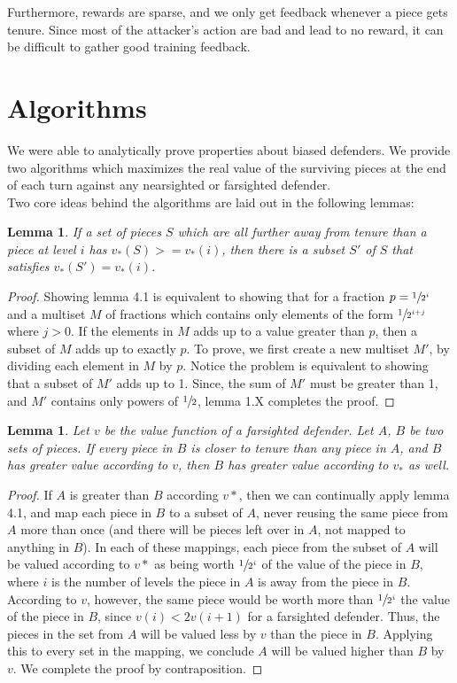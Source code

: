 \documentclass{article}
\theoremstyle{plain}
\newtheorem{lem}[thm]{Lemma}
\theoremstyle{definition}
\theoremstyle{remark}
\begin{document}
Furthermore, rewards are sparse, and we only get feedback whenever a piece gets tenure. Since most of the attacker's action are bad and lead to no reward, it can be difficult to gather good training feedback.
\section{Algorithms }
We were able to analytically prove properties about biased defenders. We provide two algorithms which maximizes the real value of the surviving pieces at the end of each turn against any nearsighted or farsighted defender.\\

Two core ideas behind the algorithms  are laid out in the following lemmas:

\begin{lem}
  If a set of pieces $S$ which are all further away from tenure than a piece at level $i$ has $v_{*}(S) >= v_{*}(i)$, then there is a subset $S'$ of $S$ that satisfies $v_{*}(S') = v_{*}(i)$.
\end{lem}


\begin{proof}
 Showing lemma 4.1 is equivalent to showing that for a fraction $p = \sfrac{1}{2^i}$ and a multiset $M$ of fractions which contains only elements of the form $\sfrac{1}{2^{i+j}}$ where $j>0$. If the elements in $M$ adds up to a value greater than $p$, then a subset of $M$ adds up to exactly $p$. To prove, we first create a new multiset $M'$, by dividing each element in $M$ by $p$. Notice the problem is equivalent to showing that a subset of $M'$ adds up to 1. Since, the sum of $M'$ must be greater than 1, and $M'$ contains only powers of $\sfrac{1}{2}$, lemma 1.X completes the proof.
\end{proof}

\begin{lem}
  Let $v$ be the value function of a farsighted defender. Let $A$, $B$ be two sets of pieces. If every piece in $B$ is closer to tenure than any piece in $A$, and  $B$ has greater value according to $v$, then $B$ has greater value according to $v_{*}$ as well.
\end{lem}

\begin{proof}
 If $A$ is greater than $B$ according $v*$, then we can continually apply lemma 4.1, and map each piece in $B$ to a subset of $A$, never reusing the same piece from $A$ more than once (and there will be pieces left over in $A$, not mapped to anything in $B$). In each of these mappings, each piece from the subset of $A$ will be valued according to $v*$ as being worth $\sfrac{1}{2^i}$ of the value of the piece in $B$, where $i$ is the number of levels the piece in $A$ is away from the piece in $B$. According to $v$, however, the same piece would be worth more than $\sfrac{1}{2^i}$ the value of the piece in $B$, since $v(i) < 2v(i+1)$ for a farsighted defender. Thus, the pieces in the set from $A$ will be valued less by $v$ than the piece in $B$. Applying this to every set in the mapping, we conclude $A$ will be valued higher than $B$ by $v$. We complete the proof by contraposition.
\end{proof}
\end{document}
